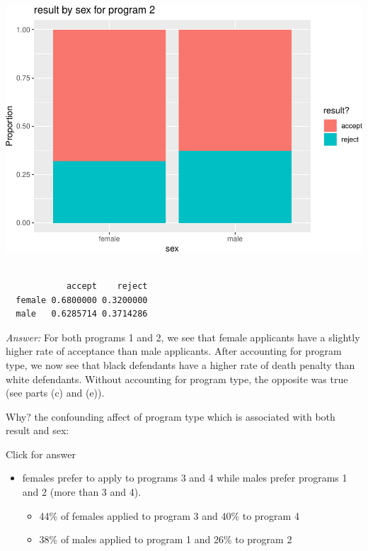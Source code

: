 \documentclass[
]{book}
\newenvironment{Shaded}{\begin{snugshade}}{\end{snugshade}}
\newcommand{\DecValTok}[1]{\textcolor[rgb]{0.00,0.00,0.81}{#1}}
\newcommand{\FunctionTok}[1]{\textcolor[rgb]{0.00,0.00,0.00}{#1}}
\newcommand{\NormalTok}[1]{#1}
\newcommand{\SpecialCharTok}[1]{\textcolor[rgb]{0.00,0.00,0.00}{#1}}
\providecommand{\tightlist}{%
  \setlength{\itemsep}{0pt}\setlength{\parskip}{0pt}}
\begin{document}
\includegraphics[width=1\linewidth]{Class_Activity_4_files/figure-latex/unnamed-chunk-34-1}

\begin{Shaded}
\end{Shaded}

\begin{verbatim}
        
            accept    reject
  female 0.6800000 0.3200000
  male   0.6285714 0.3714286
\end{verbatim}

\emph{Answer:} For both programs 1 and 2, we see that female applicants have a slightly higher rate of acceptance
than male applicants. After accounting for program type, we now see that black defendants have a higher
rate of death penalty than white defendants. Without accounting for program type, the opposite was true
(see parts (c) and (e)).

Why? the confounding affect of program type which is associated with both result and sex:

Click for answer

\begin{itemize}
\tightlist
\item
  females prefer to apply to programs 3 and 4 while males prefer programs 1 and 2 (more than 3 and
  4).

  \begin{itemize}
  \tightlist
  \item
    44\% of females applied to program 3 and 40\% to program 4
  \item
    38\% of males applied to program 1 and 26\% to program 2
  \end{itemize}
\end{itemize}
\end{document}
